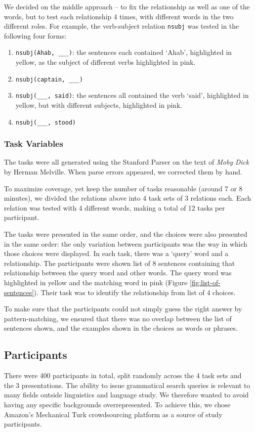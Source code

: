 \documentclass{sigchi}
\newcommand{\code}[1] {\texttt{#1}}
\begin{document}
We decided on the middle approach -- to fix the relationship as well as one of the words, but to test each relationship 4 times, with different words in the two different roles. For example, the verb-subject relation \code{nsubj} was tested in the following four forms:
\begin{enumerate}
	\item \code{nsubj(Ahab, \_\_\_)}:  the sentences each contained `Ahab', highlighted in yellow, as the subject of different verbs highlighted in pink.
	\item \code{nsubj(captain, \_\_\_)}

	\item \code{nsubj(\_\_\_, said)}: the sentences all contained the verb `said', highlighted in yellow, but with different subjects, highlighted in pink.
	\item \code{nsubj(\_\_\_, stood)}
\end{enumerate}

\subsubsection{Task Variables}

The tasks were all generated using the Stanford Parser on the text of \emph{Moby Dick} by Herman Melville. When parse errors appeared, we corrected them by hand.

To maximize coverage, yet keep the number of tasks reasonable (around 7 or 8 minutes), we divided the relations above into 4 task sets of 3 relations each. Each relation was tested with 4 different words, making a total of 12 tasks per participant.

The tasks were presented in the same order, and the choices were also presented in the same order: the only variation between participants was the way in which those choices were displayed. In each task, there was a `query' word and a relationship. The participants were shown list of 8 sentences containing that relationship between the query word and other words. The query word was highlighted in yellow and the matching word in pink (Figure \ref{fig:list-of-sentences}). Their task was to identify the relationship from list of 4 choices.

To make sure that the participants could not simply guess the right answer by pattern-matching, we ensured that there was no overlap between the list of sentences shown, and the examples shown in the choices as words or phrases.


\subsection{Participants}
There were 400 participants in total, split randomly across the 4 task sets and the 3 presentations. The ability to issue grammatical search queries is relevant to many fields outside linguistics and language study. We therefore wanted to avoid having any specific backgrounds overrepresented. To achieve this, we chose Amazon's Mechanical Turk crowdsourcing platform as a source of study participants.
\end{document}
